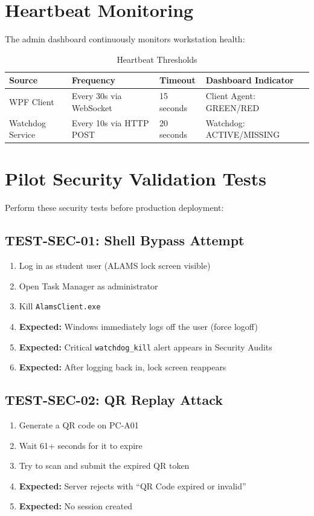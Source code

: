 \section{Heartbeat Monitoring}

The admin dashboard continuously monitors workstation health:

\begin{table}[h!]
\centering
\caption{Heartbeat Thresholds}
\label{tab:heartbeats}
\begin{tabularx}{\textwidth}{lllX}
\toprule
\textbf{Source} & \textbf{Frequency} & \textbf{Timeout} & \textbf{Dashboard Indicator}\\
\midrule
\rowcolor{aurxonlightgray}
WPF Client & Every 30s via WebSocket & 15 seconds & Client Agent: GREEN/RED\\
Watchdog Service & Every 10s via HTTP POST & 20 seconds & Watchdog: ACTIVE/MISSING\\
\bottomrule
\end{tabularx}
\end{table}

\section{Pilot Security Validation Tests}

Perform these security tests before production deployment:

\subsection{TEST-SEC-01: Shell Bypass Attempt}
\begin{enumerate}[leftmargin=*]
  \item Log in as student user (ALAMS lock screen visible)
  \item Open Task Manager as administrator
  \item Kill \texttt{AlamsClient.exe}
  \item \textbf{Expected:} Windows immediately logs off the user (force logoff)
  \item \textbf{Expected:} Critical \texttt{watchdog\_kill} alert appears in Security Audits
  \item \textbf{Expected:} After logging back in, lock screen reappears
\end{enumerate}

\subsection{TEST-SEC-02: QR Replay Attack}
\begin{enumerate}[leftmargin=*]
  \item Generate a QR code on PC-A01
  \item Wait 61+ seconds for it to expire
  \item Try to scan and submit the expired QR token
  \item \textbf{Expected:} Server rejects with ``QR Code expired or invalid''
  \item \textbf{Expected:} No session created
\end{enumerate}

